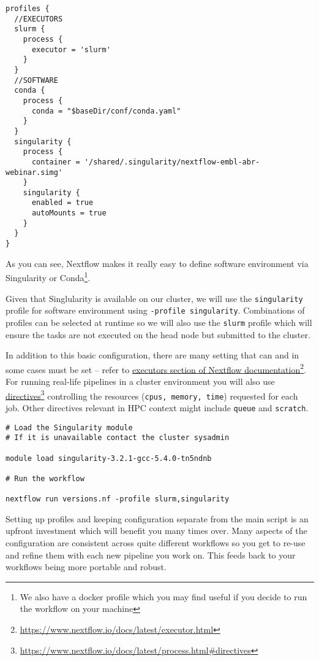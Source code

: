 \begin{lstlisting}
profiles {
  //EXECUTORS
  slurm {
    process {
      executor = 'slurm'
    }
  }
  //SOFTWARE
  conda {
    process {
      conda = "$baseDir/conf/conda.yaml"
    }
  }
  singularity {
    process {
      container = '/shared/.singularity/nextflow-embl-abr-webinar.simg' 
    }
    singularity {
      enabled = true
      autoMounts = true
    }
  }
}
\end{lstlisting}


As you can see, Nextflow makes it really easy to define software environment via Singularity 
or Conda\footnote{We also have a docker profile which you may find useful if you decide to run the workflow on your machine}. 


Given that Singlularity is available on our cluster, we will use the \texttt{singularity} profile for software environment using \texttt{-profile singularity}. Combinations of profiles can be selected at runtime 
so we will also use the \texttt{slurm} profile which will ensure the tasks are not executed on the head node but submitted to the cluster.

In addition to this basic configuration, there are many setting that can and in some cases must be set -- refer to 
\href{https://www.nextflow.io/docs/latest/executor.html}{executors section of Nextflow documentation}\footnote{\url{https://www.nextflow.io/docs/latest/executor.html}}. 
For running real-life pipelines in a cluster environment you will also use 
\href{https://www.nextflow.io/docs/latest/process.html#directives}{directives}\footnote{\url{https://www.nextflow.io/docs/latest/process.html\#directives}}
controlling the resources (\texttt{cpus, memory, time}) requested for each job. Other directives relevant in HPC context might include \texttt{queue} and \texttt{scratch}.



\begin{steps}
\begin{lstlisting}
# Load the Singularity module 
# If it is unavailable contact the cluster sysadmin

module load singularity-3.2.1-gcc-5.4.0-tn5ndnb

# Run the workflow

nextflow run versions.nf -profile slurm,singularity
\end{lstlisting}
\end{steps}


\begin{note}
Setting up profiles and keeping configuration separate from the main script is an upfront investment
which will benefit you many times over. Many aspects of the configuration are consistent across quite different workflows 
so you get to re-use and refine them with each new pipeline you work on. This feeds back to your workflows being more portable and robust. 
\end{note}

